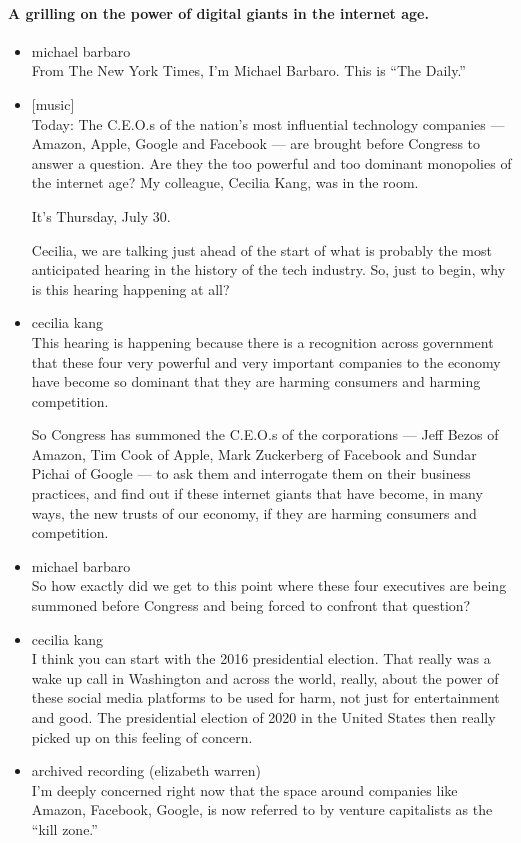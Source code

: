 \hypertarget{a-grilling-on-the-power-of-digital-giants-in-the-internet-age}{%
\paragraph{A grilling on the power of digital giants in the internet
age.}\label{a-grilling-on-the-power-of-digital-giants-in-the-internet-age}}

\begin{itemize}
\item
  michael barbaro\\
  From The New York Times, I'm Michael Barbaro. This is ``The Daily.''
\item
  {[}music{]}\\
  Today: The C.E.O.s of the nation's most influential technology
  companies --- Amazon, Apple, Google and Facebook --- are brought
  before Congress to answer a question. Are they the too powerful and
  too dominant monopolies of the internet age? My colleague, Cecilia
  Kang, was in the room.

  It's Thursday, July 30.

  Cecilia, we are talking just ahead of the start of what is probably
  the most anticipated hearing in the history of the tech industry. So,
  just to begin, why is this hearing happening at all?
\item
  cecilia kang\\
  This hearing is happening because there is a recognition across
  government that these four very powerful and very important companies
  to the economy have become so dominant that they are harming consumers
  and harming competition.

  So Congress has summoned the C.E.O.s of the corporations --- Jeff
  Bezos of Amazon, Tim Cook of Apple, Mark Zuckerberg of Facebook and
  Sundar Pichai of Google --- to ask them and interrogate them on their
  business practices, and find out if these internet giants that have
  become, in many ways, the new trusts of our economy, if they are
  harming consumers and competition.
\item
  michael barbaro\\
  So how exactly did we get to this point where these four executives
  are being summoned before Congress and being forced to confront that
  question?
\item
  cecilia kang\\
  I think you can start with the 2016 presidential election. That really
  was a wake up call in Washington and across the world, really, about
  the power of these social media platforms to be used for harm, not
  just for entertainment and good. The presidential election of 2020 in
  the United States then really picked up on this feeling of concern.
\item
  archived recording (elizabeth warren)\\
  I'm deeply concerned right now that the space around companies like
  Amazon, Facebook, Google, is now referred to by venture capitalists as
  the ``kill zone.''
\end{itemize}

